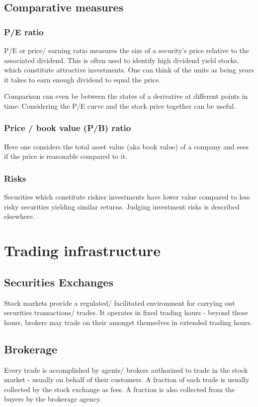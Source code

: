 \documentclass[oneside, article]{memoir}
\begin{document}
\subsection{Comparative measures}
\subsubsection{P/E ratio}
P/E or price/ earning ratio measures the size of a security's price relative to the associated dividend. This is often used to identify high dividend yield stocks, which constitute attractive investments. One can think of the units as being years it takes to earn enough dividend to equal the price.

Comparison can even be between the states of a derivative at different points in time: Considering the P/E curve and the stock price together can be useful.

\subsubsection{Price / book value (P/B) ratio}
Here one considers the total asset value (aka book value) of a company and sees if the price is reasonable compared to it.

\subsubsection{Risks}
Securities which constitute riskier investments have lower value compared to less risky securities yielding similar returns. Judging investment risks is described elsewhere.

\section{Trading infrastructure}
\subsection{Securities Exchanges}
Stock markets provide a regulated/ facilitated environment for carrying out securities transactions/ trades. It operates in fixed trading hours - beyond those hours, brokers may trade on their amongst themselves in extended trading hours.

\subsection{Brokerage}
Every trade is accomplished by agents/ brokers authorized to trade in the stock market - usually on behalf of their customers. A fraction of each trade is usually collected by the stock exchange as fees. A fraction is also collected from the buyers by the brokerage agency.
\end{document}
